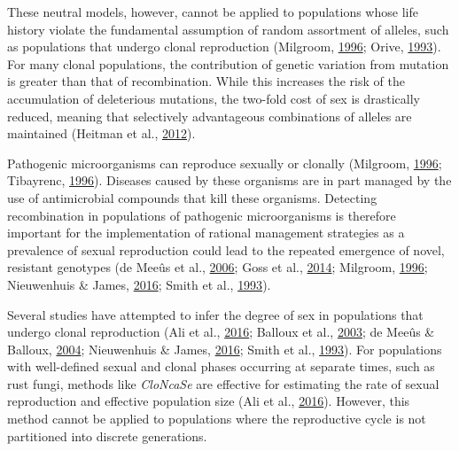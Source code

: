 \documentclass[double,11pt]{beavtex}
\begin{document}
  These neutral models, however, cannot be applied to populations whose
  life history violate the fundamental assumption of random assortment of
  alleles, such as populations that undergo clonal reproduction (Milgroom,
  \protect\hyperlink{ref-milgroom1996recombination}{1996}; Orive,
  \protect\hyperlink{ref-orive1993effective}{1993}). For many clonal
  populations, the contribution of genetic variation from mutation is
  greater than that of recombination. While this increases the risk of the
  accumulation of deleterious mutations, the two-fold cost of sex is
  drastically reduced, meaning that selectively advantageous combinations
  of alleles are maintained (Heitman et al.,
  \protect\hyperlink{ref-heitman2012evolution}{2012}).
  
  Pathogenic microorganisms can reproduce sexually or clonally (Milgroom,
  \protect\hyperlink{ref-milgroom1996recombination}{1996}; Tibayrenc,
  \protect\hyperlink{ref-tibayrenc1996towards}{1996}). Diseases caused by
  these organisms are in part managed by the use of antimicrobial
  compounds that kill these organisms. Detecting recombination in
  populations of pathogenic microorganisms is therefore important for the
  implementation of rational management strategies as a prevalence of
  sexual reproduction could lead to the repeated emergence of novel,
  resistant genotypes (de Meeûs et al.,
  \protect\hyperlink{ref-de2006molecular}{2006}; Goss et al.,
  \protect\hyperlink{ref-goss2014irish}{2014}; Milgroom,
  \protect\hyperlink{ref-milgroom1996recombination}{1996}; Nieuwenhuis \&
  James, \protect\hyperlink{ref-nieuwenhuis2016frequency}{2016}; Smith et
  al., \protect\hyperlink{ref-smith1993how}{1993}).
  
  Several studies have attempted to infer the degree of sex in populations
  that undergo clonal reproduction (Ali et al.,
  \protect\hyperlink{ref-ali2016cloncase}{2016}; Balloux et al.,
  \protect\hyperlink{ref-balloux2003population}{2003}; de Meeûs \&
  Balloux, \protect\hyperlink{ref-de2004clonal}{2004}; Nieuwenhuis \&
  James, \protect\hyperlink{ref-nieuwenhuis2016frequency}{2016}; Smith et
  al., \protect\hyperlink{ref-smith1993how}{1993}). For populations with
  well-defined sexual and clonal phases occurring at separate times, such
  as rust fungi, methods like \emph{CloNcaSe} are effective for estimating
  the rate of sexual reproduction and effective population size (Ali et
  al., \protect\hyperlink{ref-ali2016cloncase}{2016}). However, this
  method cannot be applied to populations where the reproductive cycle is
  not partitioned into discrete generations.
  
\end{document}
